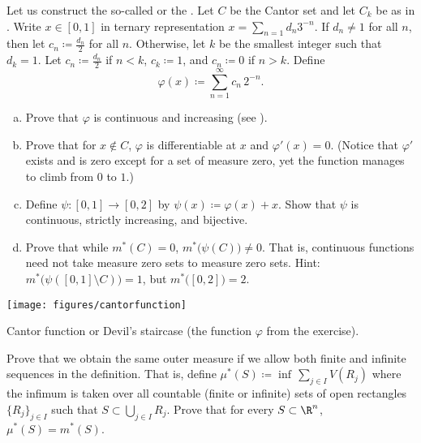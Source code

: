 \begin{samepage}
\begin{exercise}[Challenging]
Let us construct the so-called \emph{} or the 
\emph{}.  Let $C$ be the Cantor set and
let $C_k$ be as in .
Write $x \in [0,1]$ in ternary representation $x = \sum_{n=1} d_n 3^{-n}$.
If $d_n \not= 1$ for all $n$, then let $c_n \coloneqq \frac{d_n}{2}$ for all $n$.
Otherwise, let $k$ be the smallest integer such that $d_k = 1$.
Let $c_n \coloneqq \frac{d_n}{2}$ if $n < k$, $c_k \coloneqq 1$, and $c_n
\coloneqq 0$ if $n > k$.
Define
\begin{equation*}
\varphi(x) \coloneqq \sum_{n=1}^\infty c_n \, 2^{-n} .
\end{equation*}
\begin{enumerate}[a)]
\item
Prove that $\varphi$ is continuous and increasing (see
).
\item
Prove that for $x \notin C$, $\varphi$ is differentiable at $x$ and
$\varphi'(x) = 0$.
(Notice that $\varphi'$ exists and is zero except for a set of measure zero,
yet the function manages to climb from $0$ to $1$.)
\item
Define $\psi \colon [0,1] \to [0,2]$ by
$\psi(x) \coloneqq \varphi(x) + x$.
Show that $\psi$ is continuous, strictly increasing, and bijective.
\item
Prove that while $m^*(C) = 0$, $m^*\bigl(\psi(C)\bigr) \not= 0$.  That is,
continuous functions need not take measure zero sets to measure zero sets.
Hint: $m^*\bigl(\psi([0,1] \setminus C)\bigr) = 1$, but
$m^*\bigl([0,2]\bigr) = 2$.
\end{enumerate}
\end{exercise}
\end{samepage}

\begin{myfigureht}
\texttt{[image: figures/cantorfunction]}
\caption{Cantor function or Devil's staircase (the function $\varphi$ from
the exercise).\label{fig:cantorfunction}}
\end{myfigureht}

\begin{exercise} \label{exercise:allowfiniteseqsinoutermeasure}
Prove that we obtain the same outer measure if we allow both finite and
infinite sequences in
the definition.  That is, define $\mu^*(S) \coloneqq \inf\, \sum_{j \in I} V(R_j)$
where the infimum is taken over all countable (finite or infinite) sets of
open rectangles $\{ R_j \}_{j\in I}$ such that $S \subset
\bigcup_{j \in I} R_j$.  Prove that for every $S \subset \R^n$,
$\mu^*(S) = m^*(S)$.
\end{exercise}

